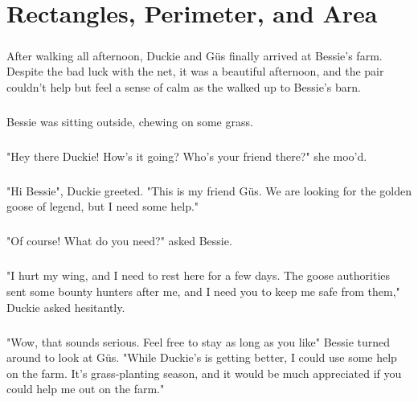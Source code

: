  \chapter{Rectangles, Perimeter, and Area}
 \paragraph{} After walking all afternoon, Duckie and Güs finally arrived at Bessie's farm. Despite the bad luck with the net, it was a beautiful afternoon, and the pair couldn't help but feel a sense of calm as the walked up to Bessie's barn.
 \paragraph{} Bessie was sitting outside, chewing on some grass.
 \paragraph{} "Hey there Duckie! How's it going? Who's your friend there?" she moo'd.
 \paragraph{} "Hi Bessie", Duckie greeted. "This is my friend Güs. We are looking for the golden goose of legend, but I need some help."
 \paragraph{} "Of course! What do you need?" asked Bessie.
 \paragraph{} "I hurt my wing, and I need to rest here for a few days. The goose authorities sent some bounty hunters after me, and I need you to keep me safe from them," Duckie asked hesitantly.
 \paragraph{} "Wow, that sounds serious. Feel free to stay as long as you like" Bessie turned around to look at Güs. "While Duckie's is getting better, I could use some help on the farm. It's grass-planting season, and it would be much appreciated if you could help me out on the farm."
